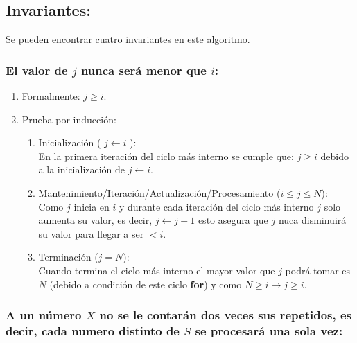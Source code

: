 \documentclass[12pt,spanish]{article}
\theoremstyle{definition}
\begin{document}
\subsection{Invariantes:}{}
Se pueden encontrar cuatro invariantes en este algoritmo.

\subsubsection{El valor de $j$ nunca será menor que $i$:}{}

\begin{enumerate}
\item Formalmente: $ j \geq i $.
\item Prueba por inducción:
    \begin{enumerate}
    \item Inicialización ( $j \leftarrow i $ ):\\
        En la primera iteración del ciclo más interno se cumple que: $ j \geq i $ debido a la inicialización de $j \leftarrow i$. 
    \item Mantenimiento/Iteración/Actualización/Procesamiento  ($ i  \le j  \le N $):\\
         Como $ j $ inicia en $i$ y durante cada iteración del ciclo más interno $j$ solo aumenta su valor, es decir, $j \leftarrow j + 1$ esto asegura que $j$ nuca disminuirá su valor para llegar a ser $< i$.
    \item Terminación ($j = N $): \\
        Cuando termina el ciclo más interno el mayor valor que $j$ podrá tomar es $N$ (debido a condición de este ciclo \textbf{for}) y como $N \geq i \rightarrow j \geq i$.
    \end{enumerate}
\end{enumerate}

\subsubsection{A un número $X$ no se le contarán dos veces sus repetidos, es decir, cada numero distinto de $S$ se procesará una sola vez:}{}
\end{document}
